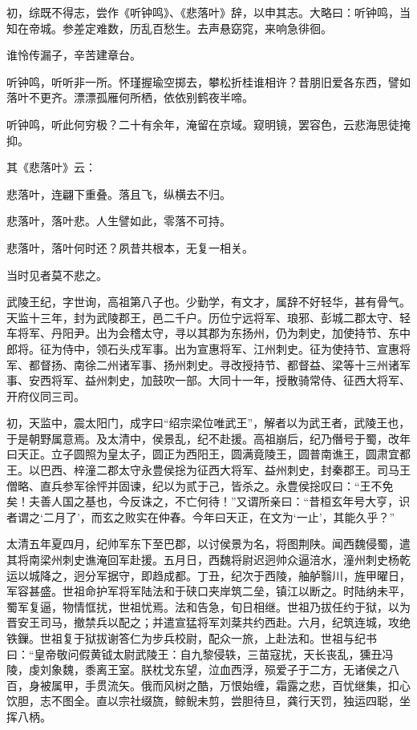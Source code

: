\documentclass[12pt,UTF8]{ctexbook}
\begin{document}
初，综既不得志，尝作《听钟鸣》、《悲落叶》辞，以申其志。大略曰：听钟鸣，当知在帝城。参差定难数，历乱百愁生。去声悬窈窕，来响急徘徊。

谁怜传漏子，辛苦建章台。

听钟鸣，听听非一所。怀瑾握瑜空掷去，攀松折桂谁相许？昔朋旧爱各东西，譬如落叶不更齐。漂漂孤雁何所栖，依依别鹤夜半啼。

听钟鸣，听此何穷极？二十有余年，淹留在京域。窥明镜，罢容色，云悲海思徒掩抑。

其《悲落叶》云：

悲落叶，连翩下重叠。落且飞，纵横去不归。

悲落叶，落叶悲。人生譬如此，零落不可持。

悲落叶，落叶何时还？夙昔共根本，无复一相关。

当时见者莫不悲之。

武陵王纪，字世询，高祖第八子也。少勤学，有文才，属辞不好轻华，甚有骨气。天监十三年，封为武陵郡王，邑二千户。历位宁远将军、琅邪、彭城二郡太守、轻车将军、丹阳尹。出为会稽太守，寻以其郡为东扬州，仍为刺史，加使持节、东中郎将。征为侍中，领石头戍军事。出为宣惠将军、江州刺史。征为使持节、宣惠将军、都督扬、南徐二州诸军事、扬州刺史。寻改授持节、都督益、梁等十三州诸军事、安西将军、益州刺史，加鼓吹一部。大同十一年，授散骑常侍、征西大将军、开府仪同三司。

初，天监中，震太阳门，成字曰“绍宗梁位唯武王”，解者以为武王者，武陵王也，于是朝野属意焉。及太清中，侯景乱，纪不赴援。高祖崩后，纪乃僭号于蜀，改年曰天正。立子圆照为皇太子，圆正为西阳王，圆满竟陵王，圆普南谯王，圆肃宜都王。以巴西、梓潼二郡太守永豊侯捴为征西大将军、益州刺史，封秦郡王。司马王僧略、直兵参军徐怦并固谏，纪以为贰于己，皆杀之。永豊侯捴叹曰：“王不免矣！夫善人国之基也，今反诛之，不亡何待！”又谓所亲曰：“昔桓玄年号大亨，识者谓之‘二月了’，而玄之败实在仲春。今年曰天正，在文为‘一止’，其能久乎？”

太清五年夏四月，纪帅军东下至巴郡，以讨侯景为名，将图荆陕。闻西魏侵蜀，遣其将南梁州刺史谯淹回军赴援。五月日，西魏将尉迟迥帅众逼涪水，潼州刺史杨乾运以城降之，迥分军据守，即趋成都。丁丑，纪次于西陵，舳舻翳川，旌甲曜日，军容甚盛。世祖命护军将军陆法和于硖口夹岸筑二垒，镇江以断之。时陆纳未平，蜀军复逼，物情恇扰，世祖忧焉。法和告急，旬日相继。世祖乃拔任约于狱，以为晋安王司马，撤禁兵以配之；并遣宣猛将军刘棻共约西赴。六月，纪筑连城，攻绝铁鏁。世祖复于狱拔谢答仁为步兵校尉，配众一旅，上赴法和。世祖与纪书曰：“皇帝敬问假黄钺太尉武陵王：自九黎侵轶，三苗寇扰，天长丧乱，獯丑冯陵，虔刘象魏，黍离王室。朕枕戈东望，泣血西浮，殒爱子于二方，无诸侯之八百，身被属甲，手贯流矢。俄而风树之酷，万恨始缠，霜露之悲，百忧继集，扣心饮胆，志不图全。直以宗社缀旒，鲸鲵未剪，尝胆待旦，龚行天罚，独运四聪，坐挥八柄。
\end{document}
